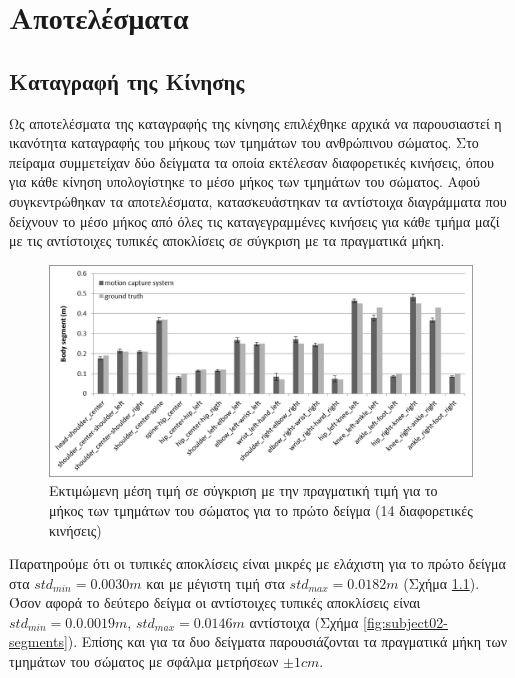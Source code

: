 \chapter{Αποτελέσματα}

\section{Καταγραφή της Κίνησης}

Ως αποτελέσματα της καταγραφής της κίνησης επιλέχθηκε αρχικά να παρουσιαστεί η ικανότητα καταγραφής του μήκους των τμημάτων του ανθρώπινου σώματος. Στο πείραμα συμμετείχαν δύο δείγματα τα οποία εκτέλεσαν διαφορετικές κινήσεις, όπου για κάθε κίνηση υπολογίστηκε το μέσο μήκος των τμημάτων του σώματος. Αφού συγκεντρώθηκαν τα αποτελέσματα, κατασκευάστηκαν τα αντίστοιχα διαγράμματα που δείχνουν το μέσο μήκος από όλες τις καταγεγραμμένες κινήσεις για κάθε τμήμα μαζί με τις αντίστοιχες τυπικές αποκλίσεις σε σύγκριση με τα πραγματικά μήκη.

\begin{figure}[H]
    \centering
    \includegraphics[width=.8\textwidth]{fig/subject01-segments.png}
    \caption{Εκτιμώμενη μέση τιμή σε σύγκριση με την πραγματική τιμή για το μήκος των τμημάτων του σώματος για το πρώτο δείγμα (14 διαφορετικές κινήσεις)}
    \label{fig:subject01-segments}
\end{figure}

Παρατηρούμε ότι οι τυπικές αποκλίσεις είναι μικρές με ελάχιστη για το πρώτο δείγμα στα $std_{min} = 0.0030m$ και με μέγιστη τιμή στα $std_{max} = 0.0182m$ (Σχήμα \ref{fig:subject01-segments}). Όσον αφορά το δεύτερο δείγμα οι αντίστοιχες τυπικές αποκλίσεις είναι $std_{min} = 0.0.0019m$, $std_{max} = 0.0146m$ αντίστοιχα (Σχήμα \ref{fig:subject02-segments}). Επίσης και για τα δυο δείγματα παρουσιάζονται τα πραγματικά μήκη των τμημάτων του σώματος με σφάλμα μετρήσεων $\pm 1cm$.

